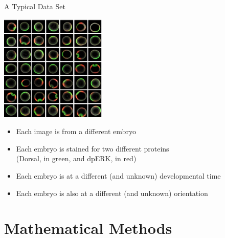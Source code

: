 \documentclass[10pt,aspectratio=169]{beamer}
\begin{document}
\begin{frame}{A Typical Data Set}
\begin{center}
\includegraphics[width=2in]{fig2a}
\end{center}

\begin{itemize}
\item Each image is from a different embryo
\item Each embryo is stained for two different proteins\\ (Dorsal, in green, and dpERK, in red)
\item Each embryo is at a different (and unknown) developmental time
\item Each embryo is also at a different (and unknown) orientation
\end{itemize}
\end{frame}

\section{Mathematical Methods}
\end{document}

